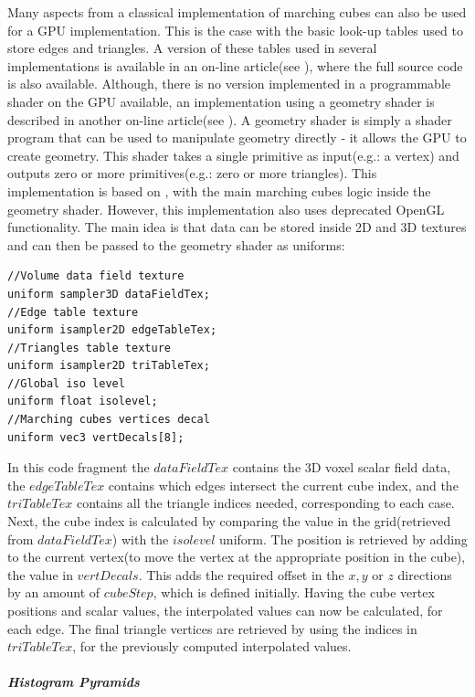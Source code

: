 \documentclass[]{article}
\begin{document}
Many aspects from a classical implementation of marching cubes can also be used for a GPU implementation. This is the case with the basic look-up tables used to store edges and triangles. A version of these tables used in several implementations is available in an on-line article(see \cite{bourke1994}), where the full source code is also available. Although, there is no version implemented in a programmable shader on the GPU available, an implementation using a geometry shader is described in another on-line article(see \cite{crassin2007}). A geometry shader is simply a shader program that can be used to manipulate geometry directly - it allows the GPU to create geometry. This shader takes a single primitive as input(e.g.: a vertex) and outputs zero or more primitives(e.g.: zero or more triangles). 
This implementation is based on \cite{bourke1994}, with the main marching cubes logic inside the geometry shader. However, this implementation also uses deprecated OpenGL functionality. The main idea is that data can be stored inside 2D and 3D textures and can then be passed to the geometry shader as uniforms:

\begin{verbatim}
//Volume data field texture
uniform sampler3D dataFieldTex;
//Edge table texture
uniform isampler2D edgeTableTex;
//Triangles table texture
uniform isampler2D triTableTex;
//Global iso level
uniform float isolevel;
//Marching cubes vertices decal
uniform vec3 vertDecals[8];
\end{verbatim}

In this code fragment  the $dataFieldTex$ contains the 3D voxel scalar field data, the $edgeTableTex$ contains which edges intersect the current cube index, and the $triTableTex$ contains all the triangle indices needed, corresponding to each case. Next, the cube index is calculated by comparing the value in the grid(retrieved from $dataFieldTex$) with the $isolevel$ uniform. The position is retrieved by adding to the current vertex(to move the vertex at the appropriate position in the cube), the value in $vertDecals$. This adds the required offset in the $x,y$ or $z$ directions by an amount of $cubeStep$, which is defined initially. Having the cube vertex positions and scalar values, the interpolated values can now be calculated, for each edge. The final triangle vertices are retrieved by using the indices in $triTableTex$, for the previously computed interpolated values.

\subparagraph{Histogram Pyramids}\mbox{}\\
\end{document}

